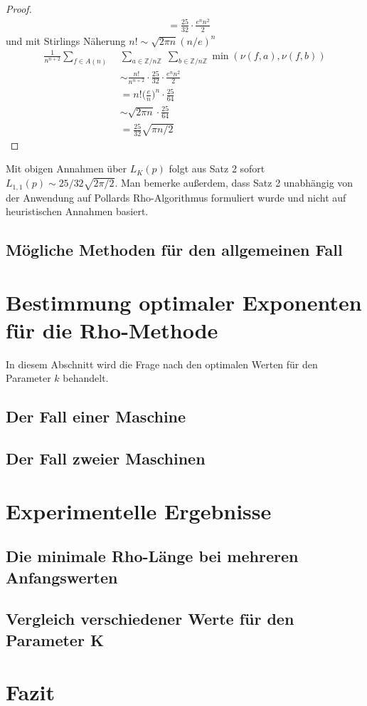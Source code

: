 \documentclass[a4paper, 10pt, ngerman]{article}
\newcommand{\Z}{\mathbb{Z}}
\begin{document}
\begin{proof}
\begin{align*}
         & = \frac {25} {32} \cdot \frac {e^n n^2} {2}
    \end{align*}
    und mit Stirlings Näherung $n! \sim \sqrt{2\pi n} (n/e)^n$
    \begin{align*}
        \frac 1 {n^{n + 2}} \sum_{f \in A(n)} \;
         & \sum_{a \in \Z/n\Z} \; \sum_{b \in \Z/n\Z} \min(\nu(f, a), \nu(f, b))    \\
         & \sim \frac {n!}{n^{n + 2}} \cdot \frac {25} {32} \cdot \frac {e^n n^2} 2 \\
         & = n! \bigg (\frac {e} {n} \bigg )^n \cdot \frac {25} {64}                \\
         & \sim \sqrt {2 \pi n} \cdot \frac {25}{64}                                \\
         & = \frac {25} {32} \sqrt{\pi n/2}
    \end{align*}
\end{proof}

\noindent Mit obigen Annahmen über $L_K(p)$ folgt aus Satz 2 sofort $L_{1, 1}(p) \sim 25/32 \sqrt{2 \pi / 2}$. Man bemerke außerdem, dass Satz 2 unabhängig von der Anwendung auf Pollards Rho-Algorithmus formuliert wurde und nicht auf heuristischen Annahmen basiert.

\subsection{Mögliche Methoden für den allgemeinen Fall}

\section{Bestimmung optimaler Exponenten für die Rho-Methode}

In diesem Abschnitt wird die Frage nach den optimalen Werten für den Parameter $k$ behandelt.

\subsection{Der Fall einer Maschine}

\subsection{Der Fall zweier Maschinen}

\section{Experimentelle Ergebnisse}\label{sec:ex}

\subsection{Die minimale Rho-Länge bei mehreren Anfangswerten}

\subsection{Vergleich verschiedener Werte für den Parameter K}

\section{Fazit}

\printbibliography
\end{document}
